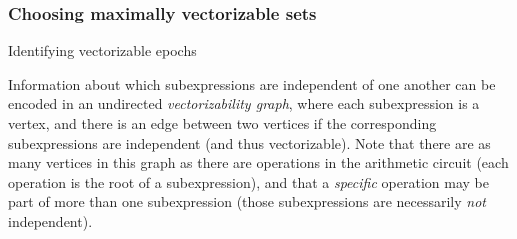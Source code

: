 \subsubsection*{Choosing maximally vectorizable sets}%
\begin{algorithm}




    \caption{Identifying vectorizable epochs}\label{alg:find-epochs}
\end{algorithm}

Information about which subexpressions are independent of one another can be encoded in an undirected {\em vectorizability graph}, where each subexpression is a vertex, and there is an edge between two vertices if the corresponding subexpressions are independent (and thus vectorizable). Note that there are as many vertices in this graph as there are operations in the arithmetic circuit (each operation is the root of a subexpression), and that a {\em specific} operation may be part of more than one subexpression (those subexpressions are necessarily {\em not} independent).

